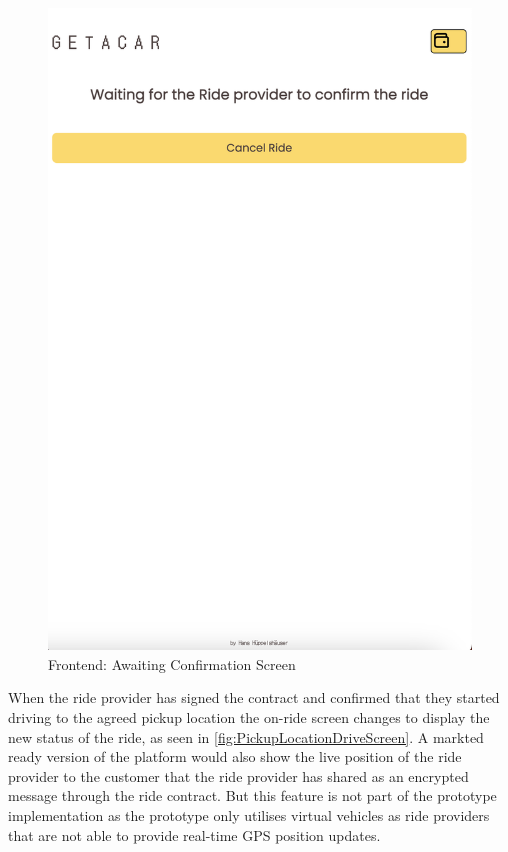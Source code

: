 \begin{figure}[H]
\begin{minipage}{0.45\linewidth}
        \label{fig:RideOverviewScreen}
    \end{minipage}
    \hfill
    \begin{minipage}{0.45\linewidth}
        \centering
        \includegraphics[width=\linewidth]{data/ffss/6.png}
        \caption{Frontend: Awaiting Confirmation Screen}
        \label{fig:AwaitingConfirmationScreen}
    \end{minipage}
    
\end{figure}

When the ride provider has signed the contract and confirmed that they started driving to the agreed pickup location the on-ride screen changes to display the new status of the ride, as seen in \ref{fig:PickupLocationDriveScreen}. A markted ready version of the platform would also show the live position of the ride provider to the customer that the ride provider has shared as an encrypted message through the ride contract. But this feature is not part of the prototype implementation as the prototype only utilises virtual vehicles as ride providers that are not able to provide real-time GPS position updates.

